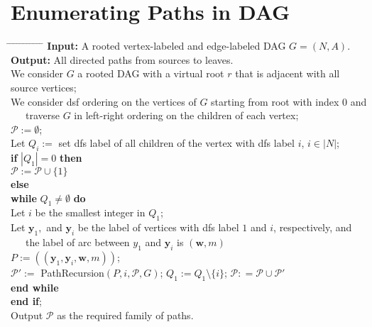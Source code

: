 \documentclass[12pt]{article}
\newcommand{\w}{\pmb{w}}
\newcommand{\y}{\pmb{y}}
\newcommand{\1}{\pmb{1}}
\newcommand{\0}{\pmb{0}}
\begin{document}
% 
% 
\section{Enumerating Paths in DAG}
\begin{tabbing}
\hspace{3mm} \= \hspace{3mm} \= \hspace{3mm} \= \hspace{3mm} \= %
\hspace{3mm} \= \hspace{3mm} \= \hspace{3mm} \= \hspace{3mm} \= %
\hspace{3mm} \= \hspace{3mm} \= \hspace{3mm} \= \hspace{3mm}  \kill
%
{\bf Input:} A rooted vertex-labeled and edge-labeled DAG 
$G = (N, A)$.\\
%
{\bf Output:} All directed paths from sources to leaves.\\
We consider $G$ a rooted DAG with a virtual root $r$ that is 
adjacent with all source vertices; \\
We consider dsf ordering on the vertices of $G$ starting from root with index $0$ and \\
~~~traverse $G$ in left-right ordering on the children of each vertex;\\
$\mathcal{P}:= \emptyset$;\\
Let $Q_i :=$ set dfs label of all children of the vertex with dfs label 
$i$, $i \in |N|$;\\
{\bf if} $|Q_1| = 0$ {\bf then} \+ \\
$\mathcal{P}:= \mathcal{P} \cup 
\{1\}$\- \\
{\bf else}\+ \\
	{\bf while} $Q_1 \neq \emptyset$ {\bf do} \+ \\
		Let $i$ be the smallest integer in $Q_1$;\\
		Let $\y_1,$  and $\y_i$ be the label of vertices with 
		dfs label $1$ and $i$, respectively, and\\
		 ~~~the label of arc between $y_1$ and $\y_i$ is 
		 $(\w, m)$\\
		$P:= ((\y_1, \y_i, \w, m))$;\\
		$\mathcal{P'}:=$ PathRecursion$(P, i, \mathcal{P}, G)$;
		$Q_1 := Q_1 \setminus \{i\}$;
		$\mathcal{P}: = \mathcal{P} \cup \mathcal{P'}$ \- \\		
	{\bf end while}\-\\
{\bf end if}; \\
Output $\mathcal{P}$ as the required family of paths.
\end{tabbing}
\end{document}

